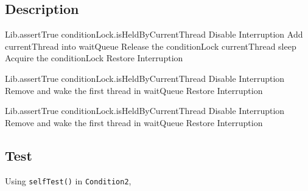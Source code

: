 \documentclass{article}
\begin{document}
\subsection{Description}
\begin{algorithm}
  \begin{algorithmic}
			\State Lib.assertTrue conditionLock.isHeldByCurrentThread
			\State Disable Interruption
			\State Add currentThread into waitQueue
			\State Release the conditionLock
			\State currentThread sleep
			\State Acquire the conditionLock
			\State Restore Interruption
		\EndProcedure
  \end{algorithmic}
	\begin{algorithmic}
			\State Lib.assertTrue conditionLock.isHeldByCurrentThread
			\State Disable Interruption
				\State Remove and wake the first thread in waitQueue
			\EndIf
			\State Restore Interruption
		\EndProcedure
  \end{algorithmic}
	\begin{algorithmic}
			\State Lib.assertTrue conditionLock.isHeldByCurrentThread
			\State Disable Interruption
				\State Remove and wake the first thread in waitQueue
			\EndWhile
			\State Restore Interruption
		\EndProcedure
  \end{algorithmic}
\end{algorithm}
\subsection{Test}
Using \texttt{selfTest()} in \texttt{Condition2},
\end{document}
